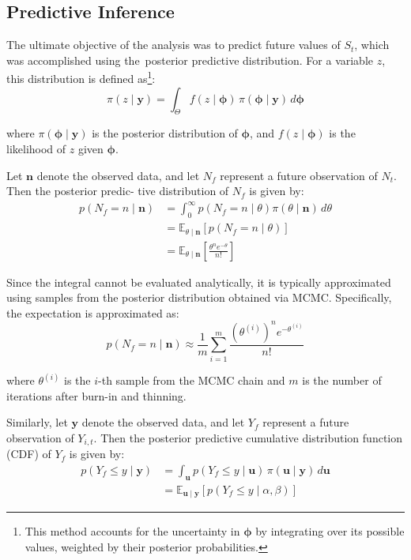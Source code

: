 \documentclass{Class/julia}
\begin{document}
\subsection{Predictive Inference}

The ultimate objective of the analysis was to predict future values of \( S_t \), which was accomplished using the~posterior predictive distribution. For a variable \( z \), this distribution is defined as\footnote{This method accounts for the uncertainty in \( \boldsymbol{\phi} \) by integrating over its possible values, weighted by their posterior probabilities.}:
\[
\pi(z \mid \mathbf{y}) = \int_{\Theta} f(z \mid \mathbf{\phi}) \, \pi(\mathbf{\phi} \mid \mathbf{y}) \, d\mathbf{\phi}
\]

\noindent where \( \pi(\mathbf{\phi} \mid \mathbf{y}) \) is the posterior distribution of \( \mathbf{\phi} \), and \( f(z \mid \mathbf{\phi}) \) is the likelihood of \( z \) given \( \mathbf{\phi} \).

Let \( \mathbf{n} \) denote the observed data, and let \( N_f \) represent a future observation of \( N_t \). Then the posterior predic- tive distribution of \( N_f \) is given by:
\[
\begin{aligned}
p (N_f = n \mid \mathbf{n}) 
&= \int_0^{\infty} p(N_f = n \mid \theta) \pi(\theta \mid \mathbf{n}) \, d\theta \\
&= \mathbb{E}_{\theta \mid \mathbf{n}}\left[ p(N_f = n \mid \theta) \right] \\
&= \mathbb{E}_{\theta \mid \mathbf{n}}\left[ \frac{\theta^n e^{-\theta}}{n!} \right]
\end{aligned}
\]

\noindent Since the integral cannot be evaluated analytically, it is typically approximated using samples from the posterior distribution obtained via MCMC. Specifically, the expectation is approximated as:
\[
p (N_f = n \mid \mathbf{n}) \approx \frac{1}{m} \sum_{i=1}^{m} \frac{(\theta^{(i)})^n e^{-\theta^{(i)}}}{n!}
\]

\noindent where \( \theta^{(i)} \) is the \( i \)-th sample from the MCMC chain and \( m \) is the number of iterations after burn-in and thinning.

Similarly, let \( \mathbf{y} \) denote the observed data, and let \( Y_f \) represent a future observation of \( Y_{i,t} \). Then the posterior predictive cumulative distribution function (CDF) of \( Y_f \) is given by:
\[
\begin{aligned}
p (Y_f \leq y \mid \mathbf{y}) 
&= \int_{\mathbf{u}} p(Y_f \leq y \mid \mathbf{u}) \, \pi(\mathbf{u} \mid \mathbf{y}) \, d\mathbf{u} \\
&= \mathbb{E}_{\mathbf{u} \mid \mathbf{y}}\left[ p(Y_f \leq y \mid \alpha, \beta) \right]
\end{aligned}
\]
\end{document}
